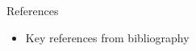 \documentclass{beamer}
\begin{document}






\begin{frame}{References}
    \begin{itemize}
        \item Key references from bibliography
    \end{itemize}
\end{frame}
\end{document}
